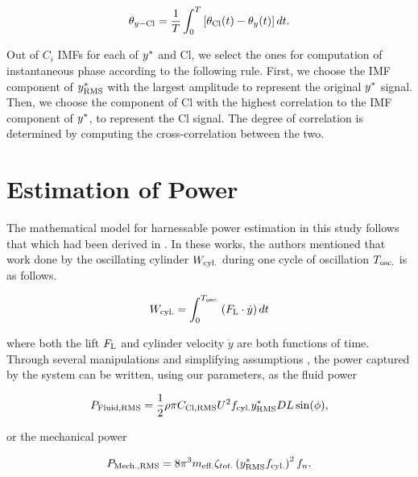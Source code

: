 \documentclass[oneside]{utmthesis}
\begin{document}

\begin{equation}
  \theta_{y-\text{Cl}} = \frac{1}{T} \int_{0}^{T} \left[ \theta_{\text{Cl}}(t) - \theta_{y}(t) \right] dt.
  \label{eq:phaseLagDefinition}
\end{equation}

Out of $C_{i}$ IMFs for each of $y^{*}$ and Cl, we select the ones for computation of instantaneous phase according to the following rule. First, we choose the IMF component of $y^{*}_{\text{RMS}}$ with the largest \rms{} amplitude to represent the original $y^{*}$ signal. Then, we choose the component of Cl with the highest correlation to the IMF component of $y^{*}$, to represent the Cl signal. The degree of correlation is determined by computing the cross-correlation between the two.

\section{Estimation of Power} \label{sec:estimationOfPower}

The mathematical model for harnessable power estimation in this study follows that which had been derived in \citet{Raghavanetal2007}. In these works, the authors mentioned that work done by the oscillating cylinder $W_{\text{cyl.}}$ during one cycle of oscillation $T_{\text{osc.}}$ is as follows.

\begin{equation}
  W_{\text{cyl.}} = \int_{0}^{T_{\text{osc.}}} \left ( F_{\text{L}} \cdot \dot{y} \right ) dt
  \label{eq:workCylinder}
\end{equation}

\noindent where both the lift $F_{\text{L}}$ and cylinder velocity $\dot{y}$ are both functions of time. Through several manipulations and simplifying assumptions \citep{Sun2016}, the power captured by the system can be written, using our parameters, as the fluid power

\begin{equation}
  P_{\text{Fluid,RMS}} = \frac{1}{2} \rho \pi C_{\text{Cl},\text{RMS}} U^{2} f_{\text{cyl.}} y^{*}_{\text{RMS}} D L \sin(\phi),
  \label{eq:rmsFluidPower}
\end{equation}

\noindent or the mechanical power

\begin{equation}
  P_{\text{Mech.,RMS}} = 8 \pi^{3} m_{\text{eff.}} \zeta_{tot.} \left (y^{*}_{\text{RMS}} f_{\text{cyl.}} \right )^{2} f_{n}.
  \label{eq:rmsMechPower}
\end{equation}
\end{document}
